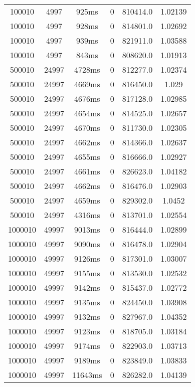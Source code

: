 \documentclass[./main.tex]{subfiles}
\begin{document}
\begin{table}
\begin{tabular}{ c | c | c | c | c | c }
        100010 & 4997 & 925ms & 0 & 810414.0 & 1.02139 \\
        \rowcolor{lightgray} 100010 & 4997 & 928ms & 0 & 814801.0 & 1.02692 \\
        100010 & 4997 & 939ms & 0 & 821911.0 & 1.03588 \\
        100010 & 4997 & 843ms & 0 & 808620.0 & 1.01913 \\
        \hline
        500010 & 24997 & 4728ms & 0 & 812277.0 & 1.02374 \\
        \rowcolor{lightgray} 500010 & 24997 & 4669ms & 0 & 816450.0 & 1.029 \\
        500010 & 24997 & 4676ms & 0 & 817128.0 & 1.02985 \\
        500010 & 24997 & 4654ms & 0 & 814525.0 & 1.02657 \\
        500010 & 24997 & 4670ms & 0 & 811730.0 & 1.02305 \\
        500010 & 24997 & 4662ms & 0 & 814366.0 & 1.02637 \\
        500010 & 24997 & 4655ms & 0 & 816666.0 & 1.02927 \\
        500010 & 24997 & 4661ms & 0 & 826623.0 & 1.04182 \\
        500010 & 24997 & 4662ms & 0 & 816476.0 & 1.02903 \\
        500010 & 24997 & 4659ms & 0 & 829302.0 & 1.0452 \\
        500010 & 24997 & 4316ms & 0 & 813701.0 & 1.02554 \\
        \hline
        1000010 & 49997 & 9013ms & 0 & 816444.0 & 1.02899 \\
        1000010 & 49997 & 9090ms & 0 & 816478.0 & 1.02904 \\
        1000010 & 49997 & 9126ms & 0 & 817301.0 & 1.03007 \\
        1000010 & 49997 & 9155ms & 0 & 813530.0 & 1.02532 \\
        1000010 & 49997 & 9142ms & 0 & 815437.0 & 1.02772 \\
        1000010 & 49997 & 9135ms & 0 & 824450.0 & 1.03908 \\
        1000010 & 49997 & 9132ms & 0 & 827967.0 & 1.04352 \\
        \rowcolor{lightgray} 1000010 & 49997 & 9123ms & 0 & 818705.0 & 1.03184 \\
        1000010 & 49997 & 9174ms & 0 & 822903.0 & 1.03713 \\
        1000010 & 49997 & 9189ms & 0 & 823849.0 & 1.03833 \\
        1000010 & 49997 & 11643ms & 0 & 826282.0 & 1.04139 \\

\end{tabular}
\end{table}
\end{document}

